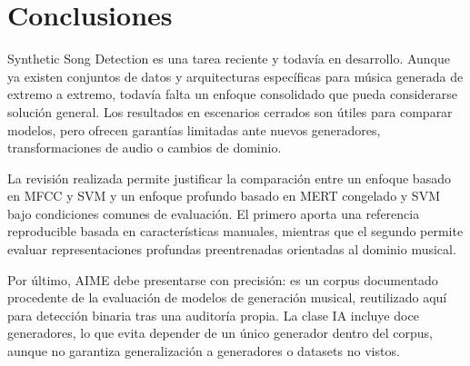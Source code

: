 \section{Conclusiones}

Synthetic Song Detection es una tarea reciente y todavía en desarrollo. Aunque ya existen conjuntos de datos y arquitecturas específicas para música generada de extremo a extremo, todavía falta un enfoque consolidado que pueda considerarse solución general. Los resultados en escenarios cerrados son útiles para comparar modelos, pero ofrecen garantías limitadas ante nuevos generadores, transformaciones de audio o cambios de dominio.

La revisión realizada permite justificar la comparación entre un enfoque basado en MFCC y SVM y un enfoque profundo basado en MERT congelado y SVM bajo condiciones comunes de evaluación. El primero aporta una referencia reproducible basada en características manuales, mientras que el segundo permite evaluar representaciones profundas preentrenadas orientadas al dominio musical.

Por último, AIME debe presentarse con precisión: es un corpus documentado procedente de la evaluación de modelos de generación musical, reutilizado aquí para detección binaria tras una auditoría propia. La clase IA incluye doce generadores, lo que evita depender de un único generador dentro del corpus, aunque no garantiza generalización a generadores o datasets no vistos.
